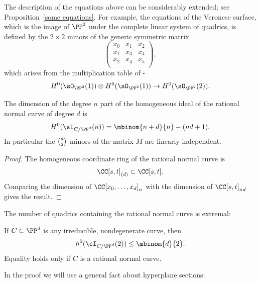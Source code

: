 \begin{fact}\label{Veronese equations fact}
The description of the equations above can be considerably extended;
see Proposition~\ref{some equations}. For example, the equations of the 
%
Veronese surface, which is the image of $\PP^{2}$
 under the complete linear system of quadrics, is defined by the $2\times 2$ minors of the generic
 symmetric matrix 
 $$
 \begin{pmatrix}
 x_{0}&x_{1}&x_{2}\\
  x_{1}&x_{3}&x_{4}\\
   x_{2}&x_{4}&x_{5}\\
\end{pmatrix}
,
$$
which arises from the multiplication table of 
\belowdisplayskip-\baselineskip
$$
H^{0}(\sO_{\PP^{2}}(1)) \otimes H^{0}(\sO_{\PP^{2}}(1)) \to H^{0}(\sO_{\PP^{2}}(2)).
$$
\end{fact}

\vspace*{3pt}

\begin{corollary}\label{forms vanishing on the RNC}
The dimension of the degree $n$ part of the homogeneous ideal of the 
rational normal curve
%
of degree $d$ is
$$
H^0(\sI_{C/\PP^d}(n)) = \mbinom{n+d}{n} - (nd+1).
$$
In particular 
the $\tbinom{d}{ 2}$ minors of the matrix $M$ are linearly independent.
\end{corollary}

\begin{proof}
The 
homogeneous coordinate ring
%
of the rational normal curve is 
$$\CC[s,t]_{(d)}\subset \CC[s,t].$$ 
Comparing the dimension
of $\CC[x_0,\dots,x_d]_n$ with the dimension of $\CC[s,t]_{nd}$ gives the result.
\end{proof}

The number of quadrics containing the
rational normal curve
%
is extremal:
%
%

\begin{proposition}\label{rnc on most quadrics}
If $C \subset \PP^d$ is any irreducible, nondegenerate curve, then
$$
h^0(\cI_{C/\PP^d}(2)) \leq  \mbinom{d}{2}.
$$
Equality holds only if
$C$ is a rational normal curve.
\unif
\end{proposition}

In the proof we will use a general fact about hyperplane sections:
%

